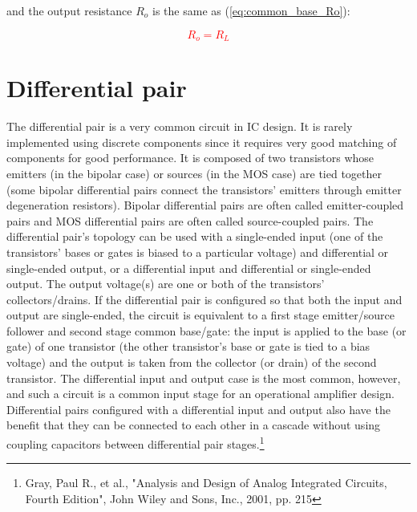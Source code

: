 \noindent and the output resistance $R_{o}$ is the same as (\ref{eq:common_base_Ro}):

\textcolor{red}{
\begin{equation}
R_{o} = R_{L}
\end{equation}
}



\section{Differential pair}
The differential pair is a very common circuit in IC design. It is rarely implemented using discrete components since it requires very good matching of components for good performance. It is composed of two transistors whose emitters (in the bipolar case) or sources (in the MOS case) are tied together (some bipolar differential pairs connect the transistors' emitters through emitter degeneration resistors). Bipolar differential pairs are often called emitter-coupled pairs and MOS differential pairs are often called source-coupled pairs. The differential pair's topology can be used with a single-ended input (one of the transistors' bases or gates is biased to a particular voltage) and differential or single-ended output, or a differential input and differential or single-ended output. The output voltage(s) are one or both of the transistors' collectors/drains. If the differential pair is configured so that both the input and output are single-ended, the circuit is equivalent to a first stage emitter/source follower and second stage common base/gate: the input is applied to the base (or gate) of one transistor (the other transistor's base or gate is tied to a bias voltage) and the output is taken from the collector (or drain) of the second transistor. The differential input and output case is the most common, however, and such a circuit is a common input stage for an operational amplifier design. Differential pairs configured with a differential input and output also have the benefit that they can be connected to each other in a cascade without using coupling capacitors between differential pair stages.\footnote{Gray, Paul R., et al., "Analysis and Design of Analog Integrated Circuits, Fourth Edition", John Wiley and Sons, Inc., 2001, pp. 215}
